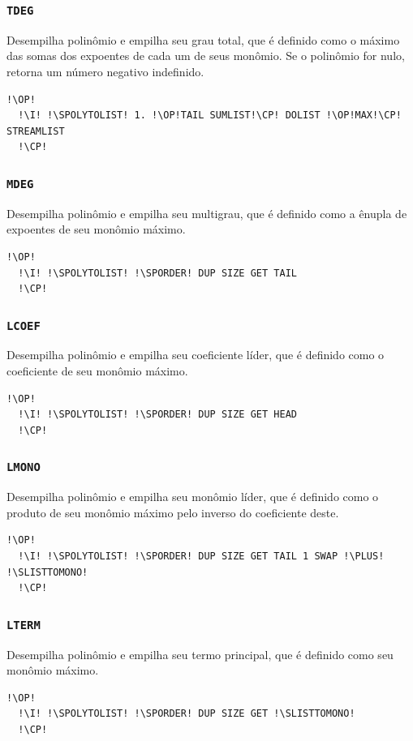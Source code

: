 \documentclass[12pt,a4paper]{report}
\newcommand{\kwd}[1]{\texttt{\textcolor{keyword}{#1}}}
\newcommand{\I}{\enspace\textcolor{indent}\vrule\hspace{2pt}}
\newcommand{\PLUS}{\kwd{+}}   %
\newcommand{\TDEG}{\kwd{TDEG}}   %
\newcommand{\MDEG}{\kwd{MDEG}}   %
\newcommand{\LCOEF}{\kwd{LCOEF}}   %
\newcommand{\LMONO}{\kwd{LMONO}}   %
\newcommand{\LTERM}{\kwd{LTERM}}   %
\newcommand{\SPOLYTOLIST}{\kwd{\$POLY{$\rightarrow$}LIST}}   %
\newcommand{\SLISTTOMONO}{\kwd{\$LIST{$\rightarrow$}MONO}}   %
\newcommand{\SPORDER}{\kwd{\$PORDER}}   %
\newcommand{\OP}{\kwd{$\ll$}}   %
\newcommand{\CP}{\kwd{$\gg$}}   %
\numberwithin{theorem}{chapter}
\begin{document}
\subsubsection{\TDEG}\label{TDEG}
Desempilha polinômio e empilha seu grau total, que é definido como o
máximo das somas dos expoentes de cada um de seus monômio.  Se o
polinômio for nulo, retorna um número negativo indefinido.
\begin{lstlisting}[language=userrpl]
  !\OP!
  !\I! !\SPOLYTOLIST! 1. !\OP!TAIL SUMLIST!\CP! DOLIST !\OP!MAX!\CP! STREAMLIST
  !\CP!
\end{lstlisting}

\subsubsection{\MDEG}\label{MDEG}
Desempilha polinômio e empilha seu multigrau, que é definido como a
ênupla de expoentes de seu monômio máximo.
\begin{lstlisting}[language=userrpl]
  !\OP!
  !\I! !\SPOLYTOLIST! !\SPORDER! DUP SIZE GET TAIL
  !\CP!
\end{lstlisting}

\subsubsection{\LCOEF}\label{LCOEF}
Desempilha polinômio e empilha seu coeficiente líder, que é definido
como o coeficiente de seu monômio máximo.
\begin{lstlisting}[language=userrpl]
  !\OP!
  !\I! !\SPOLYTOLIST! !\SPORDER! DUP SIZE GET HEAD
  !\CP!
\end{lstlisting}

\subsubsection{\LMONO}\label{LMONO}
Desempilha polinômio e empilha seu monômio líder, que é definido como
o produto de seu monômio máximo pelo inverso do coeficiente deste.
\begin{lstlisting}[language=userrpl]
  !\OP!
  !\I! !\SPOLYTOLIST! !\SPORDER! DUP SIZE GET TAIL 1 SWAP !\PLUS! !\SLISTTOMONO!
  !\CP!
\end{lstlisting}

\subsubsection{\LTERM}\label{LTERM}
Desempilha polinômio e empilha seu termo principal, que é definido
como seu monômio máximo.
\begin{lstlisting}[language=userrpl]
  !\OP!
  !\I! !\SPOLYTOLIST! !\SPORDER! DUP SIZE GET !\SLISTTOMONO!
  !\CP!
\end{lstlisting}
\end{document}
